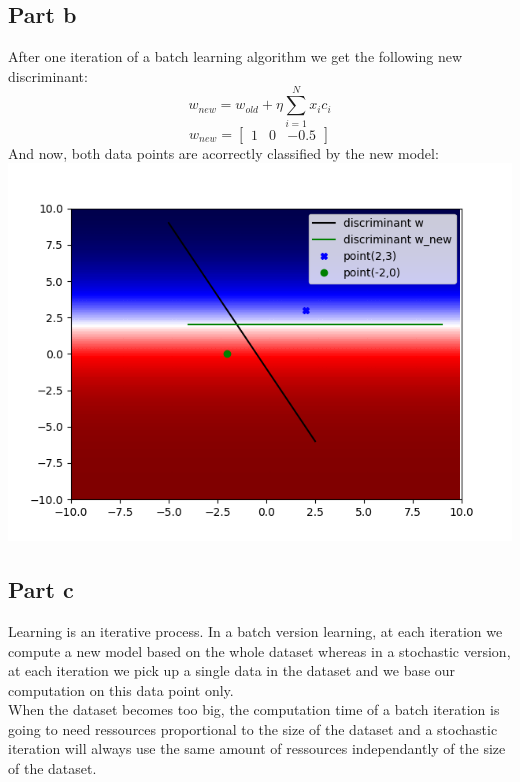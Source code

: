 \documentclass[a4paper, 10pt]{article}
\begin{document}
\subsection{Part b} 
After one iteration of a batch learning algorithm we get the following new discriminant: 
$$ 
w_{new} = w_{old} + \eta\sum_{i=1}^N x_ic_i 
$$ 
$$ 
w_{new} = \begin{bmatrix}1 & 0 & -0.5\end{bmatrix} 
$$ 
And now, both data points are acorrectly classified by the new model: 
\\ 
\includegraphics[scale=0.6]{ex1_b.png} 
\subsection{Part c} 
Learning is an iterative process. In a batch version learning, at each iteration we compute a new model 
based on the whole dataset whereas in a stochastic version, at each iteration we pick up a single data in the dataset 
and we base our computation on this data point only. 
\\ 
When the dataset becomes too big, the computation time of a batch iteration is going to need ressources 
proportional to the size of the dataset and a stochastic iteration will always use the same amount of ressources 
independantly of the size of the dataset. 
\end{document}
